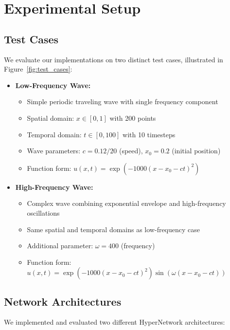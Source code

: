 \documentclass[10pt,journal,compsoc,onecolumn]{IEEEtran}
\begin{document}
\section{Experimental Setup}
\subsection{Test Cases}
We evaluate our implementations on two distinct test cases, illustrated in Figure~\ref{fig:test_cases}:

\begin{itemize}
    \item \textbf{Low-Frequency Wave:}
    \begin{itemize}
        \item Simple periodic traveling wave with single frequency component
        \item Spatial domain: $x \in [0,1]$ with 200 points
        \item Temporal domain: $t \in [0,100]$ with 10 timesteps
        \item Wave parameters: $c = 0.12/20$ (speed), $x_0 = 0.2$ (initial position)
        \item Function form: $u(x,t) = \exp(-1000(x-x_0-ct)^2)$
    \end{itemize}

    \item \textbf{High-Frequency Wave:}
    \begin{itemize}
        \item Complex wave combining exponential envelope and high-frequency oscillations
        \item Same spatial and temporal domains as low-frequency case
        \item Additional parameter: $\omega = 400$ (frequency)
        \item Function form: $u(x,t) = \exp(-1000(x-x_0-ct)^2)\sin(\omega(x-x_0-ct))$
    \end{itemize}
\end{itemize}

\subsection{Network Architectures}
We implemented and evaluated two different HyperNetwork architectures:
\end{document}
